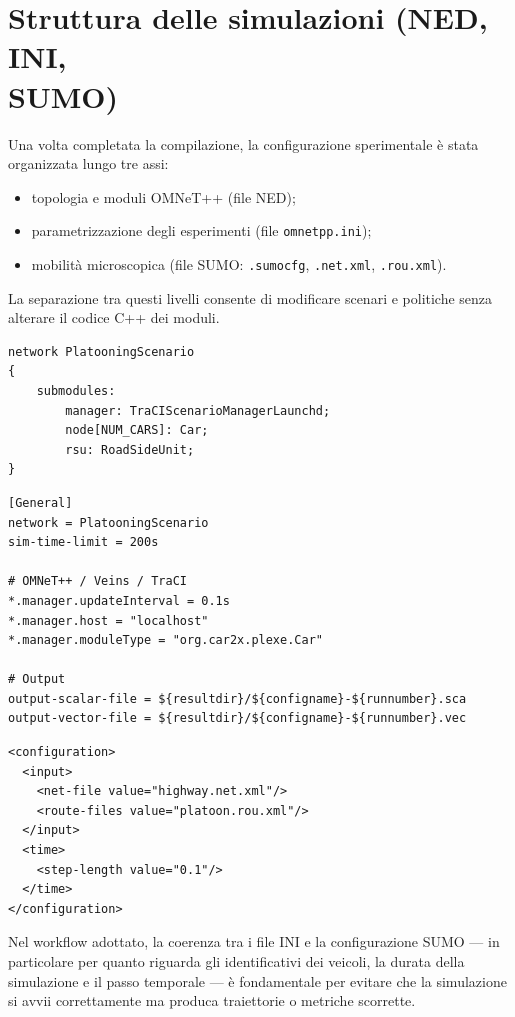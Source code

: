 \section[Struttura delle simulazioni (NED, INI, SUMO)]{Struttura delle simulazioni (NED, INI,\\ SUMO)}

Una volta completata la compilazione, la configurazione sperimentale è stata organizzata lungo tre assi:
\begin{itemize}
\item topologia e moduli OMNeT++ (file NED);
\item parametrizzazione degli esperimenti (file \texttt{omnetpp.ini});
\item mobilità microscopica (file SUMO: \texttt{.sumocfg}, \texttt{.net.xml}, \texttt{.rou.xml}).
\end{itemize}

La separazione tra questi livelli consente di modificare scenari e politiche senza alterare il codice C++ dei moduli.

\begin{lstlisting}[caption={Schema semplificato di rete NED per co-simulazione},label={lst:ned_skeleton}]
network PlatooningScenario
{
    submodules:
        manager: TraCIScenarioManagerLaunchd;
        node[NUM_CARS]: Car;
        rsu: RoadSideUnit;
}
\end{lstlisting}

\begin{lstlisting}[caption={Estratto tipo di configurazione INI multi-interfaccia},label={lst:ini_skeleton}]
[General]
network = PlatooningScenario
sim-time-limit = 200s

# OMNeT++ / Veins / TraCI
*.manager.updateInterval = 0.1s
*.manager.host = "localhost"
*.manager.moduleType = "org.car2x.plexe.Car"

# Output
output-scalar-file = ${resultdir}/${configname}-${runnumber}.sca
output-vector-file = ${resultdir}/${configname}-${runnumber}.vec
\end{lstlisting}

\begin{lstlisting}[caption={Estratto tipo di configurazione SUMO},label={lst:sumo_cfg_skeleton}]
<configuration>
  <input>
    <net-file value="highway.net.xml"/>
    <route-files value="platoon.rou.xml"/>
  </input>
  <time>
    <step-length value="0.1"/>
  </time>
</configuration>
\end{lstlisting}

Nel workflow adottato, la coerenza tra i file INI e la configurazione SUMO — in particolare per quanto riguarda gli identificativi dei veicoli, la durata della simulazione e il passo temporale — è fondamentale per evitare che la simulazione si avvii correttamente ma produca traiettorie o metriche scorrette.
